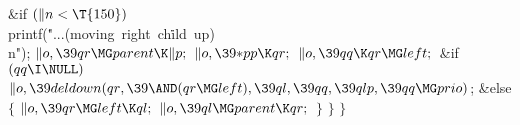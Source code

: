 \&{if} ${}(\|n<\T{150}){}$\1\5
\\{printf}(\.{"...(moving\ right\ ch}\)\.{ild\ up)\\n"});\2\6
${}\|o,\39\\{qr}\MG\\{parent}\K\|p;{}$\6
${}\|o,\39{*}\\{pp}\K\\{qr};{}$\6
${}\|o,\39\\{qq}\K\\{qr}\MG\\{left};{}$\6
\&{if} ${}(\\{qq}\I\NULL){}$\1\5
${}\|o,\39\\{deldown}(\\{qr},\39{\AND}(\\{qr}\MG\\{left}),\39\\{ql},\39\\{qq},%
\39\\{qlp},\39\\{qq}\MG\\{prio}){}$;\2\6
\&{else}\5
${}\{{}$\1\6
${}\|o,\39\\{qr}\MG\\{left}\K\\{ql};{}$\6
${}\|o,\39\\{ql}\MG\\{parent}\K\\{qr};{}$\6
\4${}\}{}$\2\6
\4${}\}{}$\2\6
\4${}\}{}$\2\par
\fi

